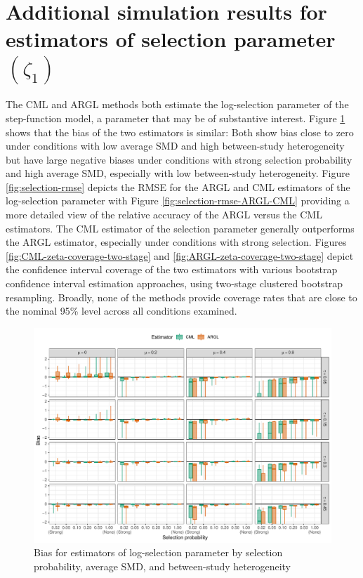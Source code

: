 \documentclass[
  american,
  man, donotrepeattitle,mask,floatsintext]{apa7}
\numberwithin{table}{section}
\numberwithin{equation}{section}
\numberwithin{figure}{section}
\begin{document}
\newpage

\section{\texorpdfstring{Additional simulation results for estimators of selection parameter \((\zeta_1)\)}{Additional simulation results for estimators of selection parameter (\textbackslash zeta\_1)}}\label{zeta-simulation-results}

The CML and ARGL methods both estimate the log-selection parameter of the step-function model, a parameter that may be of substantive interest.
Figure \ref{fig:selection-bias} shows that the bias of the two estimators is similar: Both show bias close to zero under conditions with low average SMD and high between-study heterogeneity but have large negative biases under conditions with strong selection probability and high average SMD, especially with low between-study heterogeneity.
Figure \ref{fig:selection-rmse} depicts the RMSE for the ARGL and CML estimators of the log-selection parameter with Figure \ref{fig:selection-rmse-ARGL-CML} providing a more detailed view of the relative accuracy of the ARGL versus the CML estimators.
The CML estimator of the selection parameter generally outperforms the ARGL estimator, especially under conditions with strong selection.
Figures \ref{fig:CML-zeta-coverage-two-stage} and \ref{fig:ARGL-zeta-coverage-two-stage} depict the confidence interval coverage of the two estimators with various bootstrap confidence interval estimation approaches, using two-stage clustered bootstrap resampling.
Broadly, none of the methods provide coverage rates that are close to the nominal 95\% level across all conditions examined.

\begin{figure}
\includegraphics{step-function-selection-models-supplementary-materials_files/figure-latex/selection-bias-1} \caption{Bias for estimators of log-selection parameter by selection probability, average SMD, and between-study heterogeneity}\label{fig:selection-bias}
\end{figure}
\end{document}
